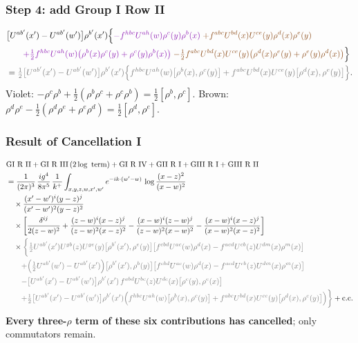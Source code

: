 \documentclass[9pt]{article}
\newcommand{\Vi}[1]{{\color{cV}#1}}
\newcommand{\Br}[1]{{\color{cN}#1}}
\newcommand{\Gr}[1]{{\color{cX}#1}}
\numberwithin{equation}{section}
\begin{document}
\subsubsection*{Step 4: add Group I Row II}
\begin{align}
&\big[U^{ab'}(x')-U^{ab'}(w')\big]\rho^{b'}(x')\Big\{\Vi{-f^{hbc}U^{ah}(w)\rho^{c}(y)\rho^{b}(x)}\;\Br{+f^{abc}U^{bd}(x)U^{ce}(y)\rho^{d}(x)\rho^{e}(y)}\notag\\
&\qquad\Vi{+\tfrac12f^{hbc}U^{ah}(w)\big(\rho^{b}(x)\rho^{c}(y)+\rho^{c}(y)\rho^{b}(x)\big)}\;\Br{-\tfrac12f^{abc}U^{bd}(x)U^{ce}(y)\big(\rho^{d}(x)\rho^{e}(y)+\rho^{e}(y)\rho^{d}(x)\big)}\Big\}\notag\\
&=\Gr{\tfrac12\big[U^{ab'}(x')-U^{ab'}(w')\big]\rho^{b'}(x')\Big\{f^{hbc}U^{ah}(w)\big[\rho^{b}(x),\rho^{c}(y)\big]+f^{abc}U^{bd}(x)U^{ce}(y)\big[\rho^{d}(x),\rho^{e}(y)\big]\Big\}}.
\end{align}
\Vi{Violet}: $-\rho^{c}\rho^{b}+\frac12(\rho^{b}\rho^{c}+\rho^{c}\rho^{b})=\frac12[\rho^{b},\rho^{c}]$. \Br{Brown}: $\rho^{d}\rho^{e}-\frac12(\rho^{d}\rho^{e}+\rho^{e}\rho^{d})=\frac12[\rho^{d},\rho^{e}]$.

\subsubsection*{Result of Cancellation I}
\begin{align}
&\text{GI R II}+\text{GI R III}\,(2\log\text{ term})+\text{GI R IV}+\text{GII R I}+\text{GIII R I}+\text{GIII R II}\notag\\
&=\frac{1}{(2\pi)^{3}}\,\frac{ig^{4}}{8\pi^{5}}\,\frac{1}{k^{+}}\int_{x,y,z,w,x',w'}e^{-ik\cdot(w'-w)}\,\log\frac{(x-z)^{2}}{(x-w)^{2}}\notag\\&\quad\times\frac{(x'-w')^{i}(y-z)^{j}}{(x'-w')^{2}(y-z)^{2}}\notag\\
&\quad\times\bigg[\frac{\delta^{ij}}{2(z-w)^{2}}+\frac{(z-w)^{i}(x-z)^{j}}{(z-w)^{2}(x-z)^{2}}-\frac{(x-w)^{i}(z-w)^{j}}{(z-w)^{2}(x-w)^{2}}-\frac{(x-w)^{i}(x-z)^{j}}{(x-w)^{2}(x-z)^{2}}\bigg]\notag\\
&\quad\times\Gr{\bigg\{\tfrac12U^{ab'}(x')U^{gb}(z)U^{ge}(y)\big[\rho^{b'}(x'),\rho^{e}(y)\big]\big[f^{cbd}U^{ac}(w)\rho^{d}(x)-f^{acd}U^{cb}(z)U^{dm}(x)\rho^{m}(x)\big]}\notag\\
&\qquad\Gr{+\Big(\tfrac12U^{ab'}(w')-U^{ab'}(x')\Big)\big[\rho^{b'}(x'),\rho^{b}(y)\big]\big[f^{cbd}U^{ac}(w)\rho^{d}(x)-f^{acd}U^{cb}(z)U^{dm}(x)\rho^{m}(x)\big]}\notag\\
&\qquad\Gr{-\big[U^{ab'}(x')-U^{ab'}(w')\big]\rho^{b'}(x')\,f^{abd}U^{bc}(z)U^{de}(x)\big[\rho^{c}(y),\rho^{e}(x)\big]}\notag\\
&\qquad\Gr{+\tfrac12\big[U^{ab'}(x')-U^{ab'}(w')\big]\rho^{b'}(x')\Big(f^{hbc}U^{ah}(w)\big[\rho^{b}(x),\rho^{c}(y)\big]+f^{abc}U^{bd}(x)U^{ce}(y)\big[\rho^{d}(x),\rho^{e}(y)\big]\Big)\bigg\}}+{\rm c.c.}
\end{align}
\textbf{Every three-$\rho$ term of these six contributions has cancelled}; only commutators remain.
\end{document}
